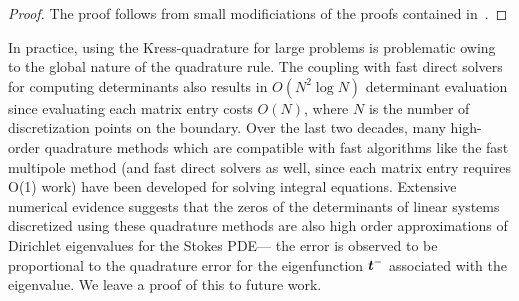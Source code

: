 \begin{proof}
The proof follows from small modificiations of the proofs contained in~\cite{zhao2015robust}. 
\end{proof}

In practice, using the Kress-quadrature for large problems is problematic owing to the global
nature of the quadrature rule. 
The coupling with fast direct solvers for computing determinants also results in $O(N^2 \log{N})$ 
determinant evaluation since evaluating each matrix entry costs $O(N)$, where 
$N$ is the number of discretization points on the boundary.
Over the last two decades, many high-order quadrature methods which are compatible with
fast algorithms like the fast multipole method (and fast direct solvers as well, 
since each matrix entry requires O(1) work) have been developed for solving
integral equations.
Extensive numerical evidence suggests that the zeros of the 
determinants of linear systems discretized using 
these quadrature methods are also high order approximations of Dirichlet eigenvalues
for the Stokes PDE--- the error is observed to be proportional to the quadrature error
for the eigenfunction ${\boldsymbol t}^{-}$ associated with the eigenvalue.
We leave a proof of this to future work.

